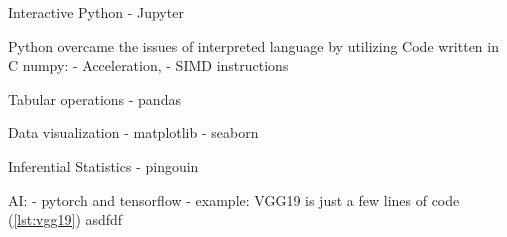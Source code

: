 Interactive Python
- Jupyter

Python overcame the issues of interpreted language by utilizing Code
written in C
numpy:
- Acceleration,
- SIMD instructions

Tabular operations
- pandas

Data visualization
- matplotlib
- seaborn


Inferential Statistics
- pingouin

AI:
- pytorch and tensorflow
- example: VGG19 is just a few lines of code (\autoref{lst:vgg19}) asdfdf


